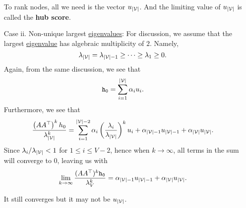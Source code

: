 \begin{enumerate}
		\begin{remark}
			To rank nodes, all we need is the vector \(u_{\left\vert \mathcal{\MakeUppercase{v}} \right\vert }\). And the limiting value of \(u_{\left\vert \mathcal{\MakeUppercase{v}} \right\vert }\) is called the \textbf{hub score}.
		\end{remark}
	\item[Case ii.] Non-unique largest \hyperref[def:eigenvalue]{eigenvalues}: For discussion, we assume that the largest \hyperref[def:eigenvalue]{eigenvalue} has algebraic multiplicity of \(2\). Namely,
		\[
			\lambda_{\left\vert \mathcal{\MakeUppercase{v}} \right\vert } = \lambda_{\left\vert \mathcal{\MakeUppercase{v}} \right\vert -1} \geq \cdots \geq \lambda_{1}\geq 0.
		\]
		Again, from the same discussion, we see that
		\[
			\mathtt{h_{0}} = \sum\limits_{i=1}^{\left\vert \mathcal{\MakeUppercase{v}} \right\vert } \alpha_{i}u_{i}.
		\]
		Furthermore, we see that
		\[
			\frac{\left(A A^{\top}\right)^k h_0}{\lambda_{\left\vert \mathcal{\MakeUppercase{v}} \right\vert }^k}
			= \sum\limits_{i=1}^{\left\vert \mathcal{\MakeUppercase{v}} \right\vert - 2} \alpha_{i}\left(\frac{\lambda_{i}}{\lambda_{\left\vert \mathcal{\MakeUppercase{v}} \right\vert }}\right)^k u_{i}
			+ \alpha_{\left\vert \mathcal{\MakeUppercase{v}} \right\vert -1}u_{\left\vert \mathcal{\MakeUppercase{v}} \right\vert -1}+\alpha_{\left\vert \mathcal{\MakeUppercase{v}} \right\vert } u_{\left\vert \mathcal{\MakeUppercase{v}} \right\vert }.
		\]
		Since \(\lambda_{i}/\lambda_{\left\vert \mathcal{\MakeUppercase{v}} \right\vert }< 1\) for \(1\leq i\leq V-2\), hence when \(k\to \infty \), all terms in the sum will converge to \(0\), leaving us with
		\[
			\lim_{k \to \infty} \frac{(A A^{\top})^{k}\mathtt{h_0}}{\lambda_V^k} = \alpha_{\left\vert \mathcal{\MakeUppercase{v}} \right\vert -1}u_{\left\vert \mathcal{\MakeUppercase{v}} \right\vert -1}
			+ \alpha_{\left\vert \mathcal{\MakeUppercase{v}} \right\vert } u_{\left\vert \mathcal{\MakeUppercase{v}} \right\vert }.
		\]
		\begin{remark}
			It still converges but it may not be \(u_{\left\vert \mathcal{\MakeUppercase{v}} \right\vert }\).
		\end{remark}
\end{enumerate}